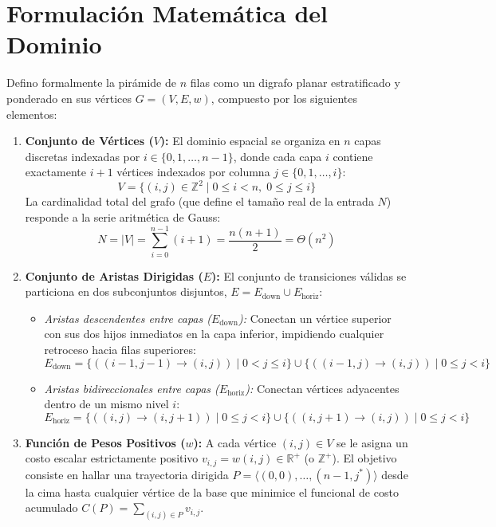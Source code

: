 \section{Formulación Matemática del Dominio}

Defino formalmente la pirámide de $n$ filas como un digrafo planar estratificado y ponderado en sus vértices $G = (V, E, w)$, compuesto por los siguientes elementos:

\begin{enumerate}
    \item \textbf{Conjunto de Vértices ($V$):} El dominio espacial se organiza en $n$ capas discretas indexadas por $i \in \{0, 1, \dots, n-1\}$, donde cada capa $i$ contiene exactamente $i+1$ vértices indexados por columna $j \in \{0, 1, \dots, i\}$:
    \[
        V = \{(i, j) \in \mathbb{Z}^2 \mid 0 \leq i < n, \; 0 \leq j \leq i\}
    \]
    La cardinalidad total del grafo (que define el tamaño real de la entrada $N$) responde a la serie aritmética de Gauss:
    \[
        N = |V| = \sum_{i=0}^{n-1} (i + 1) = \frac{n(n+1)}{2} = \Theta(n^2)
    \]

    \item \textbf{Conjunto de Aristas Dirigidas ($E$):} El conjunto de transiciones válidas se particiona en dos subconjuntos disjuntos, $E = E_{\text{down}} \cup E_{\text{horiz}}$:
    \begin{itemize}
        \item \textit{Aristas descendentes entre capas ($E_{\text{down}}$):} Conectan un vértice superior con sus dos hijos inmediatos en la capa inferior, impidiendo cualquier retroceso hacia filas superiores:
        \[
            E_{\text{down}} = \{((i-1, j-1) \to (i, j)) \mid 0 < j \leq i\} \cup \{((i-1, j) \to (i, j)) \mid 0 \leq j < i\}
        \]
        \item \textit{Aristas bidireccionales entre capas ($E_{\text{horiz}}$):} Conectan vértices adyacentes dentro de un mismo nivel $i$:
        \[
            E_{\text{horiz}} = \{((i, j) \to (i, j+1)) \mid 0 \leq j < i\} \cup \{((i, j+1) \to (i, j)) \mid 0 \leq j < i\}
        \]
    \end{itemize}

    \item \textbf{Función de Pesos Positivos ($w$):} A cada vértice $(i,j) \in V$ se le asigna un costo escalar estrictamente positivo $v_{i,j} = w(i,j) \in \mathbb{R}^+$ (o $\mathbb{Z}^+$). El objetivo consiste en hallar una trayectoria dirigida $P = \langle (0,0), \dots, (n-1, j^*) \rangle$ desde la cima hasta cualquier vértice de la base que minimice el funcional de costo acumulado $C(P) = \sum_{(i,j) \in P} v_{i,j}$.
\end{enumerate}

